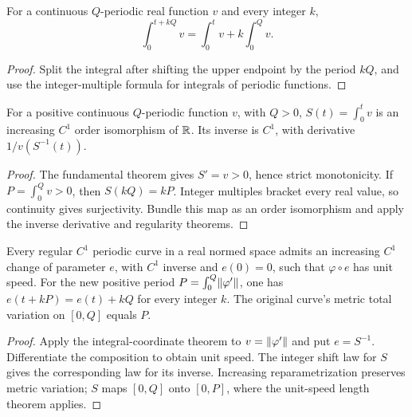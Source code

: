 \begin{lemma}
\label{lem:integral-period-shift}
\leanok
For a continuous $Q$-periodic real function $v$ and every integer $k$,
\[
 \int_0^{t+kQ}v=\int_0^t v+k\int_0^Qv.
\]
\end{lemma}
\begin{proof}
\leanok
Split the integral after shifting the upper endpoint by the period $kQ$,
and use the integer-multiple formula for integrals of periodic functions.
\end{proof}

\begin{lemma}
\label{lem:integral-coordinates}
\leanok
{}
For a positive continuous $Q$-periodic function $v$, with $Q>0$,
$S(t)=\int_0^t v$ is an increasing $C^1$ order isomorphism of $\mathbb{R}$.
Its inverse is $C^1$, with derivative $1/v(S^{-1}(t))$.
\end{lemma}
\begin{proof}
\leanok
The fundamental theorem gives $S'=v>0$, hence strict monotonicity.
If $P=\int_0^Qv>0$, then $S(kQ)=kP$. Integer multiples bracket every
real value, so continuity gives surjectivity. Bundle this map as an
order isomorphism and apply the inverse derivative and regularity theorems.
\end{proof}

\begin{proposition}
\label{prop:regular-curve-reparam}
\leanok
{}
Every regular $C^1$ periodic curve in a real normed space admits an
increasing $C^1$ change of parameter $e$, with $C^1$ inverse and $e(0)=0$,
such that $\varphi\circ e$ has unit speed. For the new positive period
$P=\int_0^Q\lVert \varphi'\rVert$, one has
$e(t+kP)=e(t)+kQ$ for every integer $k$. The original curve's metric
total variation on $[0,Q]$ equals $P$.
\end{proposition}
\begin{proof}
\leanok
Apply the integral-coordinate theorem to $v=\lVert \varphi'\rVert$ and put
$e=S^{-1}$. Differentiate the composition to obtain unit speed.
The integer shift law for $S$ gives the corresponding law for its inverse.
Increasing reparametrization preserves metric variation; $S$ maps
$[0,Q]$ onto $[0,P]$, where the unit-speed length theorem applies.
\end{proof}

